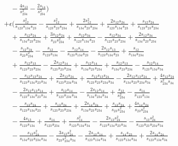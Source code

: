 \begin{align}
  & \quad - \frac{4s_{13}}{s_{234}^2} - \frac{2s_{14}}{s_{234}^2} \Bigg) \nonumber \\
& + \epsilon \Bigg(
  \frac{s_{12}^2}{s_{123}s_{134}s_{23}} - \frac{s_{12}^2}{s_{123}s_{23}s_{234}} + \frac{2s_{12}^2}{s_{134}s_{23}s_{234}} + \frac{2s_{12}s_{24}}{s_{123}s_{134}s_{23}} + \frac{s_{12}s_{24}}{s_{123}s_{23}s_{234}} \nonumber \\
  & \quad + \frac{s_{12}s_{24}}{s_{134}s_{23}s_{234}} + \frac{3s_{12}s_{24}}{s_{23}s_{234}^2} + \frac{s_{12}s_{34}}{s_{123}s_{134}s_{23}} - \frac{s_{12}s_{34}}{s_{123}s_{23}s_{234}} + \frac{2s_{12}s_{34}}{s_{134}s_{23}s_{234}} \nonumber \\
  & \quad - \frac{s_{12}s_{34}}{s_{23}s_{234}^2} - \frac{s_{12}}{s_{123}s_{134}} - \frac{s_{12}s_{14}}{s_{123}s_{134}s_{23}} - \frac{2s_{12}s_{13}}{s_{123}s_{134}s_{23}} + \frac{s_{12}}{s_{134}s_{234}} \nonumber \\
  & \quad + \frac{s_{12}s_{13}}{s_{123}s_{23}s_{234}} - \frac{2s_{12}s_{14}}{s_{123}s_{23}s_{234}} + \frac{s_{12}s_{14}}{s_{134}s_{23}s_{234}} + \frac{s_{12}s_{13}}{s_{134}s_{23}s_{234}} - \frac{s_{12}s_{14}}{s_{123}s_{134}s_{34}} \nonumber \\
  & \quad - \frac{s_{12}s_{13}s_{24}}{s_{123}s_{134}s_{23}s_{34}} + \frac{2s_{12}s_{24}}{s_{123}s_{234}s_{34}} + \frac{s_{12}s_{13}s_{24}}{s_{123}s_{23}s_{234}s_{34}} - \frac{2s_{12}s_{13}s_{24}}{s_{134}s_{23}s_{234}s_{34}} + \frac{4s_{12}s_{24}}{s_{234}^2s_{34}} \nonumber \\
  & \quad - \frac{2s_{12}s_{13}s_{14}}{s_{123}s_{134}s_{23}s_{34}} + \frac{s_{12}s_{14}}{s_{123}s_{234}s_{34}} - \frac{2s_{12}s_{14}}{s_{134}s_{234}s_{34}} + \frac{s_{12}}{s_{234}^2} - \frac{s_{14}}{s_{123}s_{134}} \nonumber \\
  & \quad - \frac{s_{13}s_{24}}{s_{123}s_{134}s_{23}} + \frac{s_{13}s_{24}}{s_{123}s_{23}s_{234}} + \frac{2s_{14}s_{24}}{s_{134}s_{23}s_{234}} + \frac{s_{13}s_{24}}{s_{23}s_{234}^2} + \frac{4s_{14}s_{24}}{s_{23}s_{234}^2} \nonumber \\
  & \quad - \frac{4s_{13}}{s_{123}s_{134}} + \frac{s_{14}}{s_{123}s_{234}} + \frac{s_{14}^2}{s_{123}s_{134}s_{34}} - \frac{2s_{13}s_{24}^2}{s_{123}s_{134}s_{23}s_{34}} - \frac{s_{13}s_{24}^2}{s_{123}s_{23}s_{234}s_{34}} \nonumber \\
  & \quad - \frac{s_{13}s_{24}^2}{s_{134}s_{23}s_{234}s_{34}} - \frac{3s_{13}s_{24}^2}{s_{23}s_{234}^2s_{34}} - \frac{2s_{13}s_{14}}{s_{123}s_{134}s_{34}} + \frac{s_{14}s_{23}}{s_{123}s_{134}s_{34}} + \frac{2s_{14}s_{24}}{s_{123}s_{134}s_{34}} \nonumber \\

\end{align}

